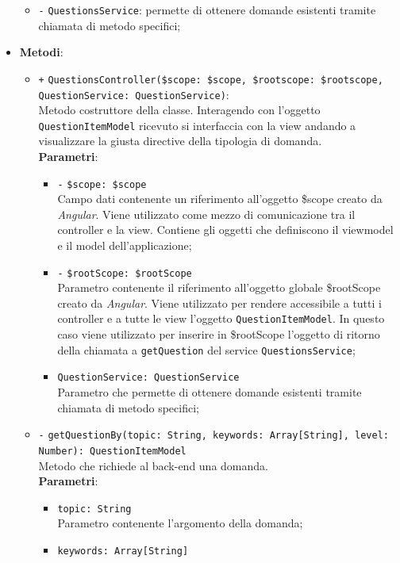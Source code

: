 \begin{itemize}
\begin{itemize}
		\item \texttt{-} \texttt{QuestionsService}: permette di ottenere domande esistenti tramite chiamata di metodo specifici;
	\end{itemize}
	\item \textbf{Metodi}:
	\begin{itemize}
		\item \texttt{+} \texttt{QuestionsController(\$scope: \$scope, \$rootscope: \$rootscope, QuestionService: QuestionService)}: \\ Metodo costruttore della classe. Interagendo con l'oggetto \texttt{QuestionItemModel} ricevuto si interfaccia con la view andando a visualizzare la giusta directive della tipologia di domanda. \\
		\textbf{Parametri}:
		\begin{itemize}
			\item \texttt{-} \texttt{\$scope: \$scope} \\
			Campo dati contenente un riferimento all’oggetto \$scope creato da \textit{Angular}. Viene utilizzato come mezzo di comunicazione tra il controller e la view. Contiene gli oggetti che definiscono il viewmodel e il model dell’applicazione;
			\item \texttt{-} \texttt{\$rootScope: \$rootScope} \\
			Parametro contenente il riferimento all'oggetto globale \$rootScope creato da \textit{Angular}. Viene utilizzato per rendere accessibile a tutti i controller e a tutte le view l'oggetto \texttt{QuestionItemModel}. In questo caso viene utilizzato per inserire in \$rootScope l'oggetto di ritorno della chiamata a \texttt{getQuestion} del service \texttt{QuestionsService}; 
			\item \texttt{QuestionService: QuestionService} \\ Parametro che permette di ottenere domande esistenti tramite chiamata di metodo specifici;
		\end{itemize}
		\item \texttt{-} \texttt{getQuestionBy(topic: String, keywords: Array[String], level: Number): QuestionItemModel} \\ Metodo che richiede al back-end una domanda. \\
		\textbf{Parametri}:
		\begin{itemize}
			\item \texttt{topic: String} \\
			Parametro contenente l'argomento della domanda;
			\item \texttt{keywords: Array[String]} \\

\end{itemize}
\end{itemize}
\end{itemize}
